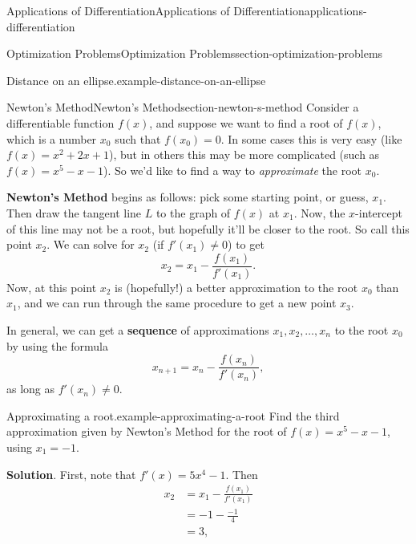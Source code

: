 \documentclass[oneside,10pt,]{book}
\newcommand{\terminology}[1]{\textbf{#1}}
\numberwithin{equation}{section}
\begin{document}
\begin{chapterptx}{Applications of Differentiation}{}{Applications of Differentiation}{}{}{applications-differentiation}
\begin{sectionptx}{Optimization Problems}{}{Optimization Problems}{}{}{section-optimization-problems}
\begin{example}{Distance on an ellipse.}{example-distance-on-an-ellipse}
\end{example}
\end{sectionptx}
%
%
\typeout{************************************************}
\typeout{************************************************}
%
\begin{sectionptx}{Newton's Method}{}{Newton's Method}{}{}{section-newton-s-method}
\hypertarget{p-366}{}%
Consider a differentiable function \(f(x)\), and suppose we want to find a root of \(f(x)\), which is a number \(x_{0}\) such that \(f(x_{0}) = 0\). In some cases this is very easy (like \(f(x) = x^{2} + 2x + 1\)), but in others this may be more complicated (such as \(f(x) = x^{5} - x  - 1\)). So we'd like to find a way to \emph{approximate} the root \(x_{0}\).%
\par
\hypertarget{p-367}{}%
\terminology{Newton's Method} begins as follows: pick some starting point, or guess, \(x_{1}\). Then draw the tangent line \(L\) to the graph of \(f(x)\) at \(x_{1}\). Now, the \(x\)-intercept of this line may not be a root, but hopefully it'll be closer to the root. So call this point \(x_{2}\). We can solve for \(x_{2}\) (if \(f'(x_{1})\neq0\)) to get%
\begin{equation*}
x_{2} = x_{1} - \frac{f(x_{1})}{f'(x_{1})}.
\end{equation*}
Now, at this point \(x_{2}\) is (hopefully!) a better approximation to the root \(x_{0}\) than \(x_{1}\), and we can run through the same procedure to get a new point \(x_{3}\).%
\par
\hypertarget{p-368}{}%
In general, we can get a \terminology{sequence} of approximations \(x_{1},x_{2},\ldots,x_{n}\) to the root \(x_{0}\) by using the formula%
\begin{equation*}
x_{n+1} = x_{n} - \frac{f(x_{n})}{f'(x_{n})},
\end{equation*}
as long as \(f'(x_{n}) \neq0\).%
\begin{example}{Approximating a root.}{example-approximating-a-root}%
\hypertarget{p-369}{}%
Find the third approximation given by Newton's Method for the root of \(f(x) = x^{5} - x - 1\), using \(x_{1} = -1\).%
\par\smallskip%
\noindent\textbf{Solution}.\hypertarget{solution-81}{}\quad%
\hypertarget{p-370}{}%
First, note that \(f'(x) = 5x^{4} - 1\). Then%
\begin{align*}
x_{2} & = x_{1} - \frac{f(x_{1})}{f'(x_{1})} \\
& = -1 - \frac{-1}{4} \\
& = 3, 

\end{align*}
\end{example}
\end{sectionptx}
\end{chapterptx}
\end{document}
